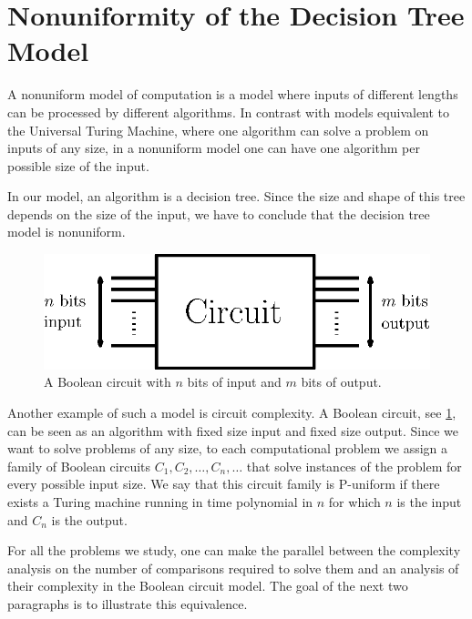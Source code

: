 \section{Nonuniformity of the Decision Tree Model}
\label{tree:sorting:nonuniformity}

A nonuniform model of computation is a model where inputs of different lengths
can be processed by different algorithms. In contrast with models equivalent to
the Universal Turing Machine, where one algorithm can solve a problem on inputs
of any size, in a nonuniform model one can have one algorithm per possible size
of the input.

In our model, an algorithm is a decision tree. Since the size and shape of
this tree depends on the size of the input, we have to conclude that the
decision tree model is nonuniform.

\begin{figure}
\center
\includegraphics[height=0.15\textheight]{fig/sorting/model/circuit}
\caption{A Boolean circuit with \(n\) bits of input and \(m\) bits of output.}
\label{fig:sorting:nonuniformity:circuit}
\end{figure}

Another example of such a model is circuit complexity. A Boolean circuit,
see \ref{fig:sorting:nonuniformity:circuit}, can be seen as an algorithm with
fixed size input and fixed size output. Since we want to solve problems of any
size, to each computational problem we assign a family of Boolean circuits
\(C_1,C_2,\ldots,C_n,\ldots\) that solve instances of the problem for every
possible input size. We say that this circuit family is P-uniform if there
exists a Turing machine running in time polynomial in \(n\) for which \(n\) is
the input and \(C_n\) is the output.

For all the problems we study, one can make the parallel between the
complexity analysis on the number of comparisons required to solve them and an
analysis of their complexity in the Boolean circuit model. The goal of the
next two paragraphs is to illustrate this equivalence.

